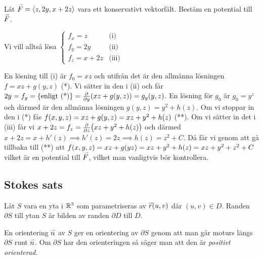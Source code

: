 \documentclass[a4paper]{article}
\begin{document}
\begin{ex}
    Låt \(
        \accentset{\rightharpoonup}{F} = \left\langle z,2y,x+2z\right\rangle
    \) vara ett konservativt vektorfält. Bestäm en potential till \(
        \accentset{\rightharpoonup}{F}
    \).

    Vi vill alltså lösa \(
        \left\{\begin{matrix}
            f_x = z & \text{(i)} \\ 
            f_y = 2y & \text{(ii)}\\ 
            f_z = x+2z & \text{(iii)}
        \end{matrix}\right.
    \) 
    
    En lösning till (i) är \(
        f_0 = xz
    \) och utifrån det är den allmänna lösningen \(
        f = xz + g(y,z)
    \) (*). Vi sätter in den i (ii) och får \(
        2y = f_y = \{\text{enligt (*)} \} = \pdv{y} (xz + g(y,z)) = g_y(y,z)
    \). En lösning för \(
        g_0
    \) är \(
        g_0 = y^z
    \) och därmed är den allmänna lösningen \(
        g(y,z) = y^2 + h(z)
    \). Om vi stoppar in den i (*) fås \(
        f(x,y,z) = xz + g(y,z) = xz + y^2 + h(z)
    \) (**). Om vi sätter in det i (iii) får vi \(
        x+2z = f_z = \pdv{z}(xz+y^2+h(z))
    \) och därmed \(
        x + 2z = x + h'(z) 
            \implies h'(z) = 2z
            \implies h(z) = z^2 + C
    \). Då får vi genom att gå tillbaka till (**) att \(
        f(x,y,z) = xz+g(yz) = xz + y^2 + h(z) = xz+y^2+z^2 + C
    \) vilket är en potential till \(
        \accentset{\rightharpoonup}{F}
    \), vilket man vanligtvis bör kontrollera. 
\end{ex}

\subsection{Stokes sats}
\begin{defn}
    Låt \(
        S 
    \) vara en yta i \(
        \mathbb{R}^3
    \) som parametriseras av \(
        \accentset{\rightharpoonup}{r}(u,v)
    \) där \(
        (u,v) \in D
    \). Randen \(
        \partial S
    \) till ytan \(
        S
    \) är bilden av randen \(
        \partial D
    \) till \(
        D
    \).

    En orientering \(
        \accentset{\rightharpoonup}{n}
    \) av \(
        S
    \) ger en orientering av \(
        \partial S
    \) genom att man går moturs längs \(
        \partial S
    \) runt \(
        \accentset{\rightharpoonup}{n}
    \). Om \(
        \partial S
    \) har den orienteringen så säger man att den är \emph{positivt orienterad}.
\end{defn}
\end{document}
